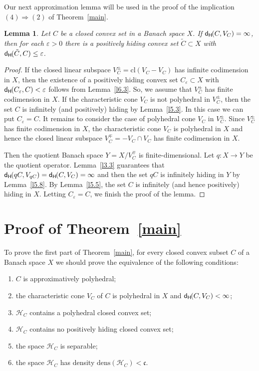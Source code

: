 \documentclass{amsart}
\newcommand{\e}{\varepsilon}
\newcommand{\HH}{\mathcal H}
\newcommand{\dens}{\mathrm{dens}}
\newcommand{\Ra}{\Rightarrow}
\newcommand{\cl}{\mathrm{cl}}
\newcommand{\dH}{\mathsf{d}_{\mathsf H}\kern-1pt}
\newtheorem{lemma}[theorem]{Lemma}
\theoremstyle{definition}
\begin{document}
Our next approximation lemma will be used in the proof of the implication $(4)\Ra(2)$ of Theorem~\ref{main}.

\begin{lemma}\label{l6.4} Let $C$ be a closed convex set in a Banach space $X$. If $\dH(C,V_C)=\infty$, then for each $\e>0$ there is a positively hiding convex set $\tilde C\subset X$ with $\dH(\tilde C,C)\le \e$.
\end{lemma}

\begin{proof} If the closed linear subspace $V_C^\pm=\cl(V_C-V_C)$ has infinite codimension in $X$, then the existence of a positively hiding convex set $C_\e\subset X$ with $\dH(C_\e,C)<\e$ follows from Lemma~\ref{l6.3}. So, we assume that $V^\pm_C$ has finite codimension in $X$. If the characteristic cone $V_C$ is not polyhedral in $V_C^\pm$, then the set $C$ is infinitely (and positively) hiding by Lemma~\ref{l5.3}. In this case we can put $C_\e=C$. It remains to consider the case of polyhedral cone $V_C$ in $V_C^\pm$. Since $V_C^\pm$ has finite codimension in $X$, the characteristic cone $V_C$ is polyhedral in $X$ and hence the closed linear subspace $V^\mp_C=-V_C\cap V_C$ has finite codimension in $X$.

Then the quotient Banach space $Y=X/V^\mp_C$ is finite-dimensional. Let $q:X\to Y$ be the quotient operator. Lemma~\ref{l3.3} guarantees that $\dH(qC,V_{qC})=\dH(C,V_C)=\infty$ and then the set $qC$ is infinitely hiding in $Y$ by Lemma~\ref{l5.8}. By Lemma~\ref{l5.5}, the set $C$ is infinitely (and hence positively) hiding in $X$. Letting $C_\e=C$, we finish the proof of the lemma.
\end{proof}

\section{Proof of Theorem~\ref{main}}\label{pf:main}

To prove the first part of Theorem~\ref{main}, for every closed convex subset $C$ of a Banach space $X$  we should prove the equivalence of the following conditions:
\begin{enumerate}
\item $C$ is approximatively polyhedral;
\item the characteristic cone $V_C$ of $C$ is polyhedral in $X$ and $\dH(C,V_C)<\infty$;
\item  $\HH_C$ contains a polyhedral closed convex set;
\item  $\HH_C$ contains no positively hiding closed convex set;
\item the space $\HH_C$ is separable;
\item the space $\HH_C$ has density $\dens(\HH_C)<\mathfrak c$.
\end{enumerate}
\end{document}
